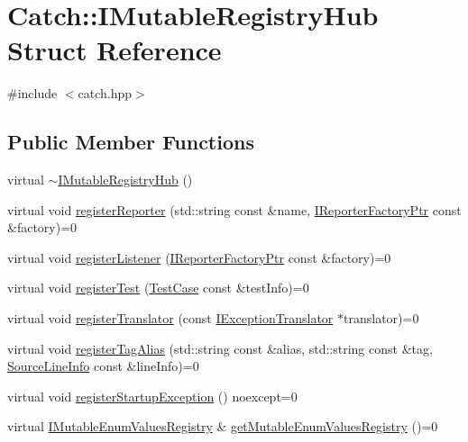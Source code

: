 \hypertarget{struct_catch_1_1_i_mutable_registry_hub}{}\section{Catch\+:\+:I\+Mutable\+Registry\+Hub Struct Reference}
\label{struct_catch_1_1_i_mutable_registry_hub}


{\ttfamily \#include $<$catch.\+hpp$>$}

\subsection*{Public Member Functions}
\begin{DoxyCompactItemize}
\item 
virtual \mbox{\hyperlink{struct_catch_1_1_i_mutable_registry_hub_a759ca1e044e19f905fb4d306f1367193}{$\sim$\+I\+Mutable\+Registry\+Hub}} ()
\item 
virtual void \mbox{\hyperlink{struct_catch_1_1_i_mutable_registry_hub_a1c0ac202ac31ee9f88e8ff5cbac4b243}{register\+Reporter}} (std\+::string const \&name, \mbox{\hyperlink{namespace_catch_ad1b36ac40c2739e52fd453dcdddf0d09}{I\+Reporter\+Factory\+Ptr}} const \&factory)=0
\item 
virtual void \mbox{\hyperlink{struct_catch_1_1_i_mutable_registry_hub_abd892a133f85581fd00ee75bb379ca56}{register\+Listener}} (\mbox{\hyperlink{namespace_catch_ad1b36ac40c2739e52fd453dcdddf0d09}{I\+Reporter\+Factory\+Ptr}} const \&factory)=0
\item 
virtual void \mbox{\hyperlink{struct_catch_1_1_i_mutable_registry_hub_a11b85c6744d88c9f83fe16ad4a8dd451}{register\+Test}} (\mbox{\hyperlink{class_catch_1_1_test_case}{Test\+Case}} const \&test\+Info)=0
\item 
virtual void \mbox{\hyperlink{struct_catch_1_1_i_mutable_registry_hub_ae6825365102693cf7707db022a2c2b49}{register\+Translator}} (const \mbox{\hyperlink{struct_catch_1_1_i_exception_translator}{I\+Exception\+Translator}} $\ast$translator)=0
\item 
virtual void \mbox{\hyperlink{struct_catch_1_1_i_mutable_registry_hub_abf2e386b6f94f615719ada711adbf822}{register\+Tag\+Alias}} (std\+::string const \&alias, std\+::string const \&tag, \mbox{\hyperlink{struct_catch_1_1_source_line_info}{Source\+Line\+Info}} const \&line\+Info)=0
\item 
virtual void \mbox{\hyperlink{struct_catch_1_1_i_mutable_registry_hub_a72a7d5386851ac3200f8da794a009c86}{register\+Startup\+Exception}} () noexcept=0
\item 
virtual \mbox{\hyperlink{struct_catch_1_1_i_mutable_enum_values_registry}{I\+Mutable\+Enum\+Values\+Registry}} \& \mbox{\hyperlink{struct_catch_1_1_i_mutable_registry_hub_ab91c4fd63eeb0efd9bfb270e8bbd231d}{get\+Mutable\+Enum\+Values\+Registry}} ()=0
\end{DoxyCompactItemize}



